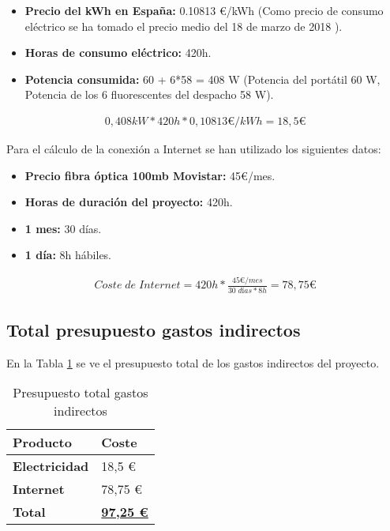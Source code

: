 \begin{itemize}
	\item \textbf{Precio del kWh en España:} 0.10813 €/kWh (Como precio de consumo eléctrico se ha tomado el precio medio del 18 de marzo de 2018 \cite{Tfg:luz} ).
	\item \textbf{Horas de consumo eléctrico:} 420h.
	\item \textbf{Potencia consumida:} 60 + 6*58 = 408 W (Potencia del portátil 60 W, Potencia de los 6 fluorescentes del despacho 58 W).
\end{itemize}

\label{eq:gastoelec}
\begin{align*}
0,408 kW * 420 h * 0,10813 \text{€}/kWh = 18,5 \text{€}
\end{align*}

Para el cálculo de la conexión a Internet se han utilizado los siguientes datos:

\begin{itemize}
	\item \textbf{Precio fibra óptica 100mb Movistar:} 45€/mes.
	\item \textbf{Horas de duración del proyecto:} 420h.
	\item \textbf{1 mes:} 30 días.
	\item \textbf{1 día:} 8h hábiles.
\end{itemize}

\label{eq:costeint}
\begin{align*}
Coste \; de \; Internet = 420h * \frac{45 \text{€}/mes}{30 \; días*8h} = 78,75 \text{€}
\end{align*}

\subsection{Total presupuesto gastos indirectos}

En la Tabla \ref{tab:prepgastosindi} se ve el presupuesto total de los gastos indirectos del proyecto.

\begin{table}[H]\label{tab:prepgastosindi}
	\centering
	\begin{tabular}{|l|l|}
		\hline
		\textbf{Producto}     & \textbf{Coste}                \\ \hline
		\textbf{Electricidad} & 18,5 €                        \\ \hline
		\textbf{Internet}     & 78,75 €                       \\ \hline
		\textbf{Total}        & \textbf{\underline{97,25 €}} \\ \hline
	\end{tabular}
	\caption{Presupuesto total gastos indirectos}
\end{table}

